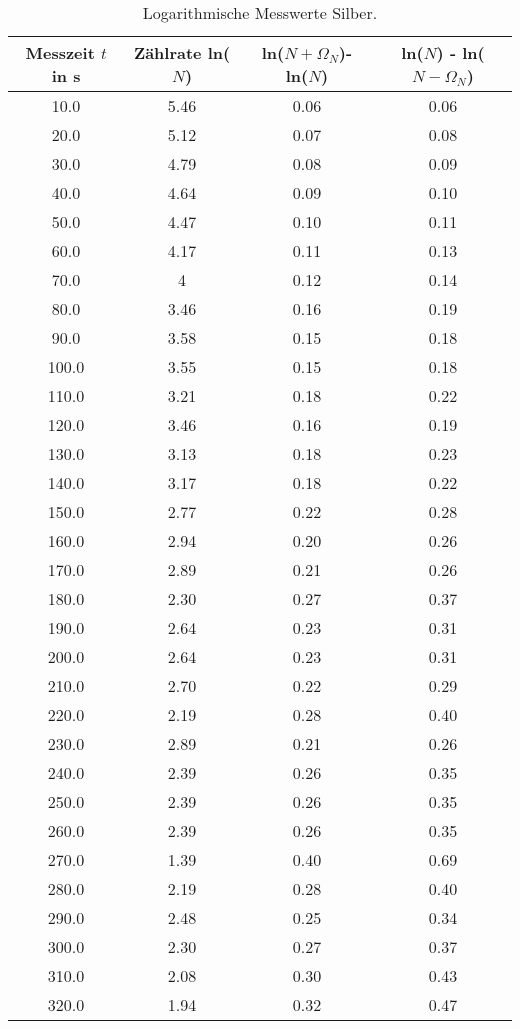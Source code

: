 \begin{table}
  \centering
  \caption{Logarithmische Messwerte Silber.}
  \label{tab:lnN2}
\begin{tabular}{c c c c}
  \toprule
  Messzeit $t$ in s & Zählrate ln($N$) & ln($N + \Omega_N$)- ln($N$) & ln($N$) - ln($N - \Omega_N$)\\
  \midrule
  10.0 & 5.46 & 0.06 & 0.06 \\
  20.0 & 5.12 & 0.07 & 0.08 \\
  30.0 & 4.79 & 0.08 & 0.09 \\
  40.0 & 4.64 & 0.09 & 0.10 \\
  50.0 & 4.47 & 0.10 & 0.11 \\
  60.0 & 4.17 & 0.11 & 0.13 \\
  70.0 & 4 & 0.12 & 0.14 \\
  80.0 & 3.46 & 0.16 & 0.19 \\
  90.0 & 3.58 & 0.15 & 0.18 \\
  100.0 & 3.55 & 0.15 & 0.18 \\
  110.0 & 3.21 & 0.18 & 0.22 \\
  120.0 & 3.46 & 0.16 & 0.19 \\
  130.0 & 3.13& 0.18 & 0.23 \\
  140.0 & 3.17 & 0.18 & 0.22 \\
  150.0 & 2.77 & 0.22 & 0.28 \\
  160.0 & 2.94 & 0.20 & 0.26 \\
  170.0 & 2.89 & 0.21 & 0.26 \\
  180.0 & 2.30 & 0.27 & 0.37 \\
  190.0 & 2.64 & 0.23 & 0.31 \\
  200.0 & 2.64 & 0.23 & 0.31 \\
  210.0 & 2.70 & 0.22 & 0.29 \\
  220.0 & 2.19 & 0.28 & 0.40 \\
  230.0 & 2.89 & 0.21 & 0.26 \\
  240.0 & 2.39 & 0.26 & 0.35 \\
  250.0 & 2.39 & 0.26 & 0.35 \\
  260.0 & 2.39 & 0.26 & 0.35 \\
  270.0 & 1.39 & 0.40 & 0.69 \\
  280.0 & 2.19 & 0.28 & 0.40 \\
  290.0 & 2.48 & 0.25 & 0.34 \\
  300.0 & 2.30 & 0.27 & 0.37 \\
  310.0 & 2.08 & 0.30 & 0.43 \\
  320.0 & 1.94 & 0.32 & 0.47 \\

\end{tabular}
\end{table}
